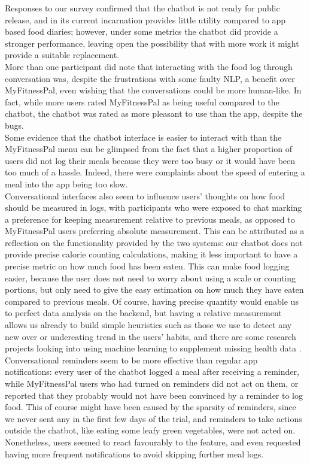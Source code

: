 Responses to our survey confirmed that the chatbot is not ready for public release, and in its current incarnation provides little utility compared to app based food diaries; however, under some metrics the chatbot did provide a stronger performance, leaving open the possibility that with more work it might provide a suitable replacement. \\
More than one participant did note that interacting with the food log through conversation was, despite the frustrations with some faulty NLP, a benefit over MyFitnessPal, even wishing that the conversations could be more human-like. In fact, while more users rated MyFitnessPal as being useful compared to the chatbot, the chatbot was rated as more pleasant to use than the app, despite the bugs. \\
Some evidence that the chatbot interface is easier to interact with than the MyFitnessPal menu can be glimpsed from the fact that a higher proportion of users did not log their meals because they were too busy or it would have been too much of a hassle. Indeed, there were complaints about the speed of entering a meal into the app being too slow.\\
Conversational interfaces also seem to influence users' thoughts on how food should be measured in logs, with participants who were exposed to chat marking a preference for keeping measurement relative to previous meals, as opposed to MyFitnessPal users preferring absolute measurement. This can be attributed as a reflection on the functionality provided by the two systems: our chatbot does not provide precise calorie counting calculations, making it less important to have a precise metric on how much food has been eaten. This can make food logging easier, because the user does not need to worry about using a scale or counting portions, but only need to give the easy estimation on how much they have eaten compared to previous meals. Of course, having precise quantity would enable us to perfect data analysis on the backend, but having a relative measurement allows us already to build simple heuristics such as those we use to detect any new over or undereating trend in the users' habits, and there are some research projects looking into using machine learning to supplement missing health data \cite{wolters}. \\
Conversational reminders seem to be more effective than regular app notifications: every user of the chatbot logged a meal after receiving a reminder, while MyFitnessPal users who had turned on reminders did not act on them, or reported that they probably would not have been convinced by a reminder to log food. This of course might have been caused by the sparsity of reminders, since we never sent any in the first few days of the trial, and reminders to take actions outside the chatbot, like eating some leafy green vegetables, were not acted on. Nonetheless, users seemed to react favourably to the feature, and even requested having more frequent notifications to avoid skipping further meal logs. 

